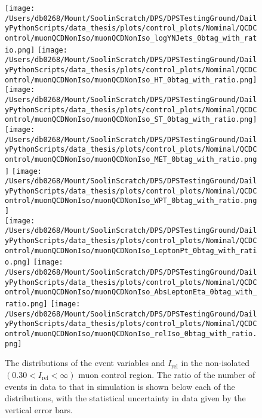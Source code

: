 \begin{figure}[hp!]
	\centering
	\texttt{[image: /Users/db0268/Mount/SoolinScratch/DPS/DPSTestingGround/DailyPythonScripts/data\_thesis/plots/control\_plots/Nominal/QCDControl/muonQCDNonIso/muonQCDNonIso\_logYNJets\_0btag\_with\_ratio.png]}
	\texttt{[image: /Users/db0268/Mount/SoolinScratch/DPS/DPSTestingGround/DailyPythonScripts/data\_thesis/plots/control\_plots/Nominal/QCDControl/muonQCDNonIso/muonQCDNonIso\_HT\_0btag\_with\_ratio.png]}
	\texttt{[image: /Users/db0268/Mount/SoolinScratch/DPS/DPSTestingGround/DailyPythonScripts/data\_thesis/plots/control\_plots/Nominal/QCDControl/muonQCDNonIso/muonQCDNonIso\_ST\_0btag\_with\_ratio.png]} \\
	\texttt{[image: /Users/db0268/Mount/SoolinScratch/DPS/DPSTestingGround/DailyPythonScripts/data\_thesis/plots/control\_plots/Nominal/QCDControl/muonQCDNonIso/muonQCDNonIso\_MET\_0btag\_with\_ratio.png]}
	\texttt{[image: /Users/db0268/Mount/SoolinScratch/DPS/DPSTestingGround/DailyPythonScripts/data\_thesis/plots/control\_plots/Nominal/QCDControl/muonQCDNonIso/muonQCDNonIso\_WPT\_0btag\_with\_ratio.png]} \\
	\texttt{[image: /Users/db0268/Mount/SoolinScratch/DPS/DPSTestingGround/DailyPythonScripts/data\_thesis/plots/control\_plots/Nominal/QCDControl/muonQCDNonIso/muonQCDNonIso\_LeptonPt\_0btag\_with\_ratio.png]} 
	\texttt{[image: /Users/db0268/Mount/SoolinScratch/DPS/DPSTestingGround/DailyPythonScripts/data\_thesis/plots/control\_plots/Nominal/QCDControl/muonQCDNonIso/muonQCDNonIso\_AbsLeptonEta\_0btag\_with\_ratio.png]}
	\texttt{[image: /Users/db0268/Mount/SoolinScratch/DPS/DPSTestingGround/DailyPythonScripts/data\_thesis/plots/control\_plots/Nominal/QCDControl/muonQCDNonIso/muonQCDNonIso\_relIso\_0btag\_with\_ratio.png]}
	\caption[The distributions of the event variables and $I_{\mathrm{rel}}$ in the non-isolated $(0.30 < I_{\mathrm{rel}} < \infty )$ muon control region. The ratio of the number of events in data to that in simulation is shown below each of the distributions, with the statistical uncertainty in data given by the vertical error bars.]{The distributions of the event variables and $I_{\mathrm{rel}}$ in the non-isolated $(0.30 < I_{\mathrm{rel}} < \infty )$ muon control region. The ratio of the number of events in data to that in simulation is shown below each of the distributions, with the statistical uncertainty in data given by the vertical error bars.}
	\label{fig:QCDmuNonIso}
\end{figure}
